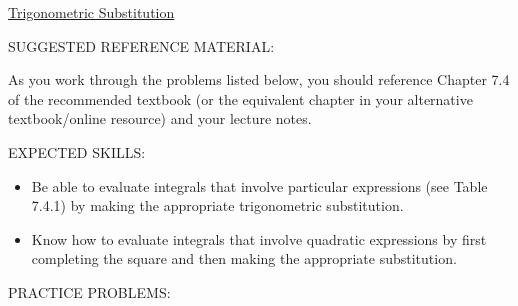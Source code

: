 \documentclass[12pt]{article}
\begin{document}
\begin{center}
\underline{\LARGE{Trigonometric Substitution}}
\end{center}

\noindent SUGGESTED REFERENCE MATERIAL:

\bigskip

\noindent As you work through the problems listed below, you should reference Chapter 7.4 of the recommended textbook (or the equivalent chapter in your alternative textbook/online resource) and your lecture notes.

\bigskip

\noindent EXPECTED SKILLS:

\begin{itemize}

\item Be able to evaluate integrals that involve particular expressions (see Table 7.4.1) by making the appropriate trigonometric substitution.

\item Know how to evaluate integrals that involve quadratic expressions by first completing the square and then making the appropriate substitution. 

\end{itemize}

\noindent PRACTICE PROBLEMS:

\medskip

\end{document}
